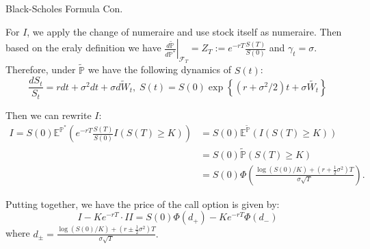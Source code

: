 \documentclass{beamer}
\begin{document}
\begin{frame}{Black-Scholes Formula Con.}

    {\footnotesize \footnotesize
    \par For $I$, we apply the change of numeraire and use stock itself as numeraire. Then based on the eraly definition
    we have $\left.\frac{d\tilde{\mathbb{P}}}{d\mathbb{P}^*}\right|_{\mathcal{F}_T} = Z_T :=  e^{-rT}\frac{S(T)}{S(0)}$
    and $\gamma_t = \sigma$. Therefore, under \(\tilde{\mathbb{P}}\) we have the following dynamics of \(S(t)\):
    \[
    \frac{dS_t}{S_t} = rdt + \sigma^2 dt + \sigma \tilde{dW_t},\;
    S(t) = S(0) \exp \left\{ (r + \sigma^2/2) t + \sigma \tilde{W_t} \right\}
    \]\pause
    \par Then we can rewrite $I$:
    \begin{align*}
        I = S(0)\mathbb{E}^{\mathbb{P}^*} \left( e^{-rT} \frac{S(T)}{S(0)} I(S(T) \geq K) \right) &= S(0) \mathbb{E}^{\tilde{\mathbb{P}}} (I(S(T) \geq K)) \\
        &= S(0) \tilde{\mathbb{P}}(S(T) \geq K)\\
       & = S(0) \Phi \left( \frac{\log(S(0)/K) + (r + \frac{1}{2} \sigma^2) T}{\sigma \sqrt{T}} \right).
    \end{align*}\pause
   \par Putting together, we have the price of the call option is given by:
    \[
    I - Ke^{-rT} \cdot II = S(0) \Phi(d_+) - Ke^{-rT} \Phi(d_-)
    \]
where $d_{\pm} = \frac{\log(S(0)/K) + (r \pm \frac{1}{2} \sigma^2) T}{\sigma \sqrt{T}}.$

    }
\end{frame}
\end{document}
